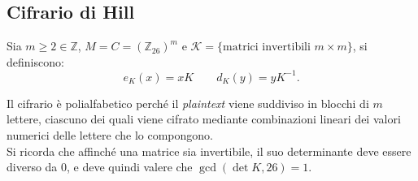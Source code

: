     



\subsection{Cifrario di Hill}
    Sia $m \geq 2 \in \mathbb{Z}$, $M = C = (\mathbb{Z}_{26})^{m}$ e $\mathcal{K} = \{ \text{matrici invertibili } m \times m\}$, si definiscono:
    \[
        e_K(x) = xK \qquad d_K(y) = yK^{-1}.
    \]


\noindent Il cifrario è polialfabetico perché il \textit{plaintext} viene suddiviso in blocchi di $m$ lettere, ciascuno dei quali viene  cifrato mediante combinazioni lineari dei valori numerici delle lettere che lo compongono. \\ Si ricorda che affinché una matrice sia invertibile, il suo determinante deve essere diverso da $0$, e deve quindi valere che $ \gcd(\det K,26)=1$.


